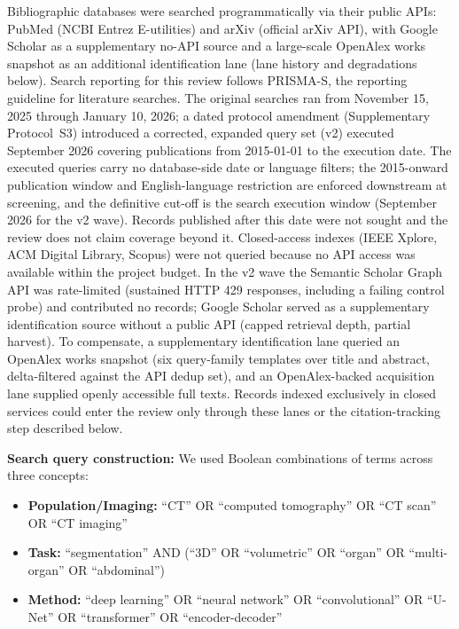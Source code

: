 Bibliographic databases were searched programmatically via their public APIs: PubMed (NCBI Entrez E-utilities) and arXiv (official arXiv API), with Google Scholar as a supplementary no-API source and a large-scale OpenAlex works snapshot as an additional identification lane (lane history and degradations below). Search reporting for this review follows PRISMA-S, the reporting guideline for literature searches. The original searches ran from November 15, 2025 through January 10, 2026; a dated protocol amendment (Supplementary Protocol~S3) introduced a corrected, expanded query set (v2) executed September 2026 covering publications from 2015-01-01 to the execution date. The executed queries carry no database-side date or language filters; the 2015-onward publication window and English-language restriction are enforced downstream at screening, and the definitive cut-off is the search execution window (September 2026 for the v2 wave). Records published after this date were not sought and the review does not claim coverage beyond it. Closed-access indexes (IEEE Xplore, ACM Digital Library, Scopus) were not queried because no API access was available within the project budget. In the v2 wave the Semantic Scholar Graph API was rate-limited (sustained HTTP 429 responses, including a failing control probe) and contributed no records; Google Scholar served as a supplementary identification source without a public API (capped retrieval depth, partial harvest). To compensate, a supplementary identification lane queried an OpenAlex works snapshot (six query-family templates over title and abstract, delta-filtered against the API dedup set), and an OpenAlex-backed acquisition lane supplied openly accessible full texts. Records indexed exclusively in closed services could enter the review only through these lanes or the citation-tracking step described below.

\textbf{Search query construction:} We used Boolean combinations of terms across three concepts:

\begin{itemize}
    \item \textbf{Population/Imaging:} ``CT'' OR ``computed tomography'' OR ``CT scan'' OR ``CT imaging''
    \item \textbf{Task:} ``segmentation'' AND (``3D'' OR ``volumetric'' OR ``organ'' OR ``multi-organ'' OR ``abdominal'')
    \item \textbf{Method:} ``deep learning'' OR ``neural network'' OR ``convolutional'' OR ``U-Net'' OR ``transformer'' OR ``encoder-decoder''
\end{itemize}


